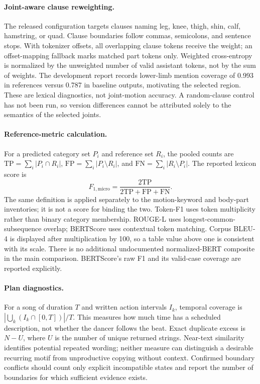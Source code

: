 \paragraph{Joint-aware clause reweighting.}
The released configuration targets clauses naming leg, knee, thigh,
shin, calf, hamstring, or quad. Clause boundaries follow commas,
semicolons, and sentence stops. With tokenizer offsets, all overlapping
clause tokens receive the weight; an offset-mapping fallback marks
matched part tokens only. Weighted cross-entropy is normalized by the
unweighted number of valid assistant tokens, not by the sum of weights.
The development report records lower-limb mention coverage of 0.993
in references versus 0.787 in baseline outputs, motivating the selected
region. These are lexical diagnostics, not joint-motion accuracy.
A random-clause control has not been run, so version differences cannot
be attributed solely to the semantics of the selected joints.

\paragraph{Reference-metric calculation.}
For a predicted category set $P_i$ and reference set $R_i$, the pooled
counts are $\mathrm{TP}=\sum_i|P_i\cap R_i|$,
$\mathrm{FP}=\sum_i|P_i\setminus R_i|$, and
$\mathrm{FN}=\sum_i|R_i\setminus P_i|$. The reported lexicon score is
\begin{equation}
 F_{1,\mathrm{micro}}=
 \frac{2\mathrm{TP}}{2\mathrm{TP}+\mathrm{FP}+\mathrm{FN}}.
\end{equation}
The same definition is applied separately to the motion-keyword and
body-part inventories; it is not a score for binding the two. Token-F1
uses token multiplicity rather than binary category membership.
ROUGE-L uses longest-common-subsequence overlap; BERTScore uses
contextual token matching. Corpus BLEU-4 is displayed after multiplication
by 100, so a table value above one is consistent with its scale.
There is no additional undocumented normalized-BERT composite in the
main comparison. BERTScore's raw F1 and its valid-case coverage are
reported explicitly.

\paragraph{Plan diagnostics.}
For a song of duration $T$ and written action intervals $I_k$, temporal
coverage is $|\bigcup_k(I_k\cap[0,T])|/T$. This measures how much time
has a scheduled description, not whether the dancer follows the beat.
Exact duplicate excess is $N-U$, where $U$ is the number of unique
returned strings. Near-text similarity identifies potential repeated
wording; neither measure can distinguish a desirable recurring motif
from unproductive copying without context. Confirmed boundary conflicts
should count only explicit incompatible states and report the number
of boundaries for which sufficient evidence exists.

